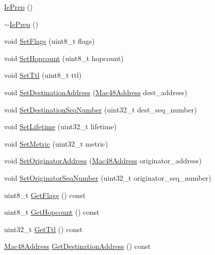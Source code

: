 \begin{DoxyCompactItemize}
\item 
\hyperlink{classns3_1_1dot11s_1_1IePrep_a02928cb3b998d4b78df6a08f19a035cd}{Ie\+Prep} ()
\item 
\hyperlink{classns3_1_1dot11s_1_1IePrep_a8ded9326f8f7560e75ac9fac91234c98}{$\sim$\+Ie\+Prep} ()
\item 
void \hyperlink{classns3_1_1dot11s_1_1IePrep_a50c6d2713cfdff48ddd1b95b152d6b97}{Set\+Flags} (uint8\+\_\+t flags)
\item 
void \hyperlink{classns3_1_1dot11s_1_1IePrep_a58b59d9cffc1247486bef0bf60c4fdb3}{Set\+Hopcount} (uint8\+\_\+t hopcount)
\item 
void \hyperlink{classns3_1_1dot11s_1_1IePrep_a1155f21ce31631f4da106b8dda7a691b}{Set\+Ttl} (uint8\+\_\+t ttl)
\item 
void \hyperlink{classns3_1_1dot11s_1_1IePrep_a8d218f3c7c479204872eee14534caef4}{Set\+Destination\+Address} (\hyperlink{classns3_1_1Mac48Address}{Mac48\+Address} dest\+\_\+address)
\item 
void \hyperlink{classns3_1_1dot11s_1_1IePrep_a1ba3be8cec54e8b0bb575f8153047dad}{Set\+Destination\+Seq\+Number} (uint32\+\_\+t dest\+\_\+seq\+\_\+number)
\item 
void \hyperlink{classns3_1_1dot11s_1_1IePrep_abf262a80dc89da34b8e8feb3aa1038ec}{Set\+Lifetime} (uint32\+\_\+t lifetime)
\item 
void \hyperlink{classns3_1_1dot11s_1_1IePrep_a88622b058efe4d3a40a1ae4a0daac412}{Set\+Metric} (uint32\+\_\+t metric)
\item 
void \hyperlink{classns3_1_1dot11s_1_1IePrep_a86179a652f5a26382b2a64325d162931}{Set\+Originator\+Address} (\hyperlink{classns3_1_1Mac48Address}{Mac48\+Address} originator\+\_\+address)
\item 
void \hyperlink{classns3_1_1dot11s_1_1IePrep_ad3c8051b8507fecfedc4b1880a8fb558}{Set\+Originator\+Seq\+Number} (uint32\+\_\+t originator\+\_\+seq\+\_\+number)
\item 
uint8\+\_\+t \hyperlink{classns3_1_1dot11s_1_1IePrep_abb188c6bab85bb13d52eefd05b166374}{Get\+Flags} () const 
\item 
uint8\+\_\+t \hyperlink{classns3_1_1dot11s_1_1IePrep_abf9218900eb34fcf3a7af5845a95fdb3}{Get\+Hopcount} () const 
\item 
uint32\+\_\+t \hyperlink{classns3_1_1dot11s_1_1IePrep_a05a6d16e27854dfa8e8142fe0d4cbf90}{Get\+Ttl} () const 
\item 
\hyperlink{classns3_1_1Mac48Address}{Mac48\+Address} \hyperlink{classns3_1_1dot11s_1_1IePrep_a1466ab31603d612bf82ae08eb6968276}{Get\+Destination\+Address} () const 

\end{DoxyCompactItemize}
